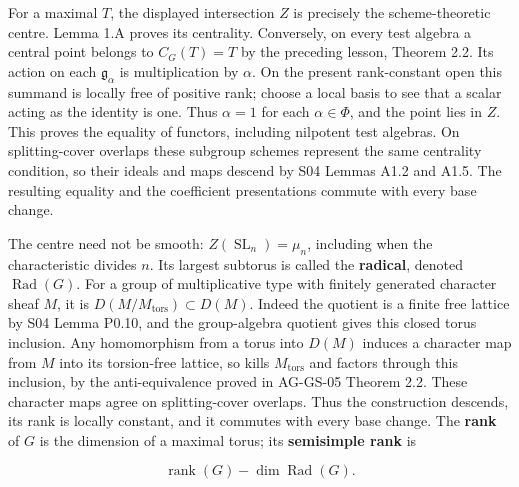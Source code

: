 \documentclass[11pt,a4paper,openany]{report}
\begin{document}
For a maximal \(T\), the displayed intersection \(Z\) is precisely the scheme-theoretic centre. Lemma 1.A proves its centrality. Conversely, on every test algebra a central point belongs to \(C_G(T)=T\) by the preceding lesson, Theorem 2.2. Its action on each \(\mathfrak g_\alpha\) is multiplication by \(\alpha\). On the present rank-constant open this summand is locally free of positive rank; choose a local basis to see that a scalar acting as the identity is one. Thus \(\alpha=1\) for each \(\alpha\in\Phi\), and the point lies in \(Z\). This proves the equality of functors, including nilpotent test algebras. On splitting-cover overlaps these subgroup schemes represent the same centrality condition, so their ideals and maps descend by S04 Lemmas A1.2 and A1.5. The resulting equality and the coefficient presentations commute with every base change.

The centre need not be smooth: \(Z(\operatorname{SL}_n)=\mu_n\), including when the characteristic divides \(n\). Its largest subtorus is called the \textbf{radical}, denoted \(\operatorname{Rad}(G)\). For a group of multiplicative type with finitely generated character sheaf \(M\), it is \(D(M/M_{\mathrm{tors}})\subset D(M)\). Indeed the quotient is a finite free lattice by S04 Lemma P0.10, and the group-algebra quotient gives this closed torus inclusion. Any homomorphism from a torus into \(D(M)\) induces a character map from \(M\) into its torsion-free lattice, so kills \(M_{\mathrm{tors}}\) and factors through this inclusion, by the anti-equivalence proved in AG-GS-05 Theorem 2.2. These character maps agree on splitting-cover overlaps. Thus the construction descends, its rank is locally constant, and it commutes with every base change. The \textbf{rank} of \(G\) is the dimension of a maximal torus; its \textbf{semisimple rank} is

\[
\operatorname{rank}(G)-\dim\operatorname{Rad}(G).
\]
\end{document}
